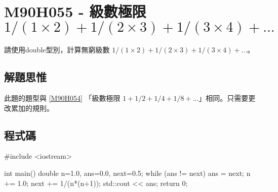 \section{M90H055 - 級數極限 $1/(1\times 2)+1/(2\times 3)+1/(3\times 4)+...$}
請使用double型別，計算無窮級數 $1/(1\times 2)+1/(2\times 3)+1/(3\times 4)+...$。 

\subsection{解題思惟}
此題的題型與
\ref{M90H054}
「級數極限 $1+1/2+1/4+1/8+...$」相同。只需要更改累加的規則。


\subsection{程式碼}
\begin{cppcode}
#include <iostream>

int main()
{
	double n=1.0, ans=0.0, next=0.5;
	while (ans != next) {
		ans = next;
		n += 1.0;
		next += 1/(n*(n+1)); 
	}
	std::cout << ans;
	return 0;
}
\end{cppcode}
